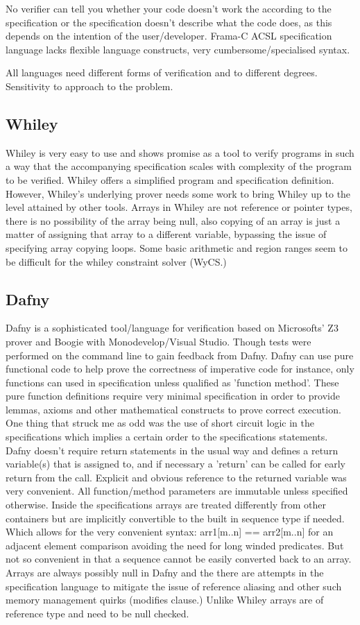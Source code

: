 \documentclass[10pt]{article} %
\begin{document}
No verifier can tell you whether your code doesn't work the according to the specification or the specification doesn't describe what the code does, as this depends on the intention of the user\slash developer.
Frama-C ACSL specification language lacks flexible language constructs, very cumbersome\slash specialised syntax.

All languages need different forms of verification and to different degrees. Sensitivity to approach to the problem.
\subsection{Whiley}
	Whiley is very easy to use and shows promise as a tool to verify programs in such a way that the accompanying specification scales with complexity of the program to be verified. Whiley offers a simplified program and specification definition. However, Whiley's underlying prover needs some work to bring Whiley up to the level attained by other tools. Arrays in Whiley are not reference or pointer types, there is no possibility of the array being null, also copying of an array is just a matter of assigning that array to a different variable, bypassing the issue of specifying array copying loops. Some basic arithmetic and region ranges seem to be difficult for the whiley constraint solver (WyCS.)
\subsection{Dafny}
	Dafny is a sophisticated tool\slash language for verification based on Microsofts' Z3 prover and Boogie with Monodevelop\slash Visual Studio. Though tests were performed on the command line to gain feedback from Dafny. Dafny can use pure functional code to help prove the correctness of imperative code for instance, only functions can used in specification unless qualified as 'function method'. These pure function definitions require very minimal specification in order to provide lemmas, axioms and other mathematical constructs to prove correct execution. One thing that struck me as odd was the use of short circuit logic in the specifications which implies a certain order to the specifications statements. Dafny doesn't require return statements in the usual way and defines a return variable(s) that is assigned to, and if necessary a 'return' can be called for early return from the call. Explicit and obvious reference to the returned variable was very convenient. All function\slash method parameters are immutable unless specified otherwise.
	Inside the specifications arrays are treated differently from other containers but are implicitly convertible to the built in sequence type if needed. Which allows for the very convenient syntax: arr1[m..n] == arr2[m..n] for an adjacent element comparison avoiding the need for long winded predicates. But not so convenient in that a sequence cannot be easily converted back to an array. Arrays are always possibly null in Dafny and the there are attempts in the specification language to mitigate the issue of reference aliasing and other such memory management quirks (modifies clause.) Unlike Whiley arrays are of reference type and need to be null checked.
\end{document}
